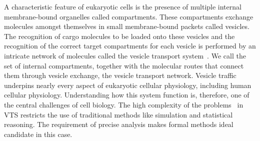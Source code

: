 A characteristic feature of eukaryotic cells is the presence of multiple internal membrane-bound organelles called compartments.
% 
These compartments exchange molecules amongst themselves in small membrane-bound packets called vesicles. 
%
The recognition of cargo molecules to be loaded onto these vesicles and the recognition of the correct target compartments for each vesicle is performed by an intricate network of molecules called the vesicle transport system~\cite{alberts2002molecular}. 
%
We call the set of internal compartments, together with the molecular routes that connect them through vesicle exchange, the vesicle transport network. 
%
Vesicle traffic underpins nearly every aspect of eukaryotic cellular physiology, including
human cellular physiology.
%
Understanding how this system function is, therefore,
one of the central challenges of cell biology.
%
The high complexity of the problems~\cite{mani2016wine, mani2016stacking} in VTS restricts the use of traditional methods like simulation and statistical reasoning. 
The requirement of precise analysis makes formal methods ideal candidate in this case. 

